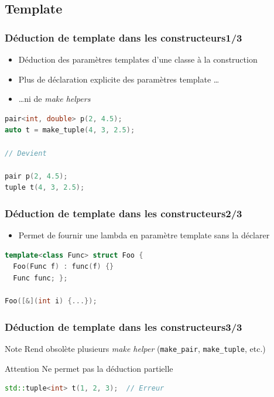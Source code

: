 \documentclass[C++.tex]{subfiles}
\begin{document}
\subsection*{Template}
\begin{frame}[fragile]
	\frametitle{Déduction de template dans les constructeurs\titlehfill{}1/3}
	\begin{itemize}
		\item Déduction des paramètres templates d'une classe à la construction
		\item Plus de déclaration explicite des paramètres template \ldots
		\item \ldots{}ni de \textit{make helpers}
	\end{itemize}


	\begin{lstlisting}[language=C++]
pair<int, double> p(2, 4.5);
auto t = make_tuple(4, 3, 2.5);

// Devient

pair p(2, 4.5);
tuple t(4, 3, 2.5);\end{lstlisting}

\end{frame}

\begin{frame}[fragile]
	\frametitle{Déduction de template dans les constructeurs\titlehfill{}2/3}
	\begin{itemize}
		\item Permet de fournir une lambda en paramètre template sans la déclarer
	\end{itemize}

	\begin{lstlisting}[language=C++]
template<class Func> struct Foo { 
  Foo(Func f) : func(f) {} 
  Func func; };

Foo([&](int i) {...});\end{lstlisting}
\end{frame}

\begin{frame}[fragile]
\frametitle{Déduction de template dans les constructeurs\titlehfill{}3/3}
	\begin{block}{Note}
		Rend obsolète plusieurs \textit{make helper} (\lstinline|make_pair|, \lstinline|make_tuple|, etc.)
	\end{block}

	\begin{alertblock}{Attention}
		Ne permet pas la déduction partielle
		
		\begin{lstlisting}[language=C++]
std::tuple<int> t(1, 2, 3);  // Erreur\end{lstlisting}
	\end{alertblock}

\end{frame}
\end{document}
